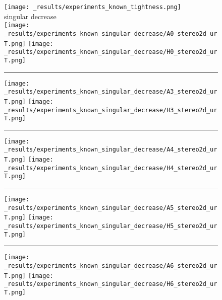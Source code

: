 \documentclass[11pt]{article}
\begin{document}
\newpage
\FloatBarrier
\begin{figure}[h]
  \centering
  \texttt{[image: \_results/experiments\_known\_tightness.png]} \\
  singular decrease \\
  \texttt{[image: \_results/experiments\_known\_singular\_decrease/A0\_stereo2d\_urT.png]}
  \texttt{[image: \_results/experiments\_known\_singular\_decrease/H0\_stereo2d\_urT.png]} 
  \\
  \hrule
  \texttt{[image: \_results/experiments\_known\_singular\_decrease/A3\_stereo2d\_urT.png]}
  \texttt{[image: \_results/experiments\_known\_singular\_decrease/H3\_stereo2d\_urT.png]} \\
  \hrule
  \texttt{[image: \_results/experiments\_known\_singular\_decrease/A4\_stereo2d\_urT.png]}
  \texttt{[image: \_results/experiments\_known\_singular\_decrease/H4\_stereo2d\_urT.png]} \\
  \hrule
  \texttt{[image: \_results/experiments\_known\_singular\_decrease/A5\_stereo2d\_urT.png]}
  \texttt{[image: \_results/experiments\_known\_singular\_decrease/H5\_stereo2d\_urT.png]} \\
  \hrule
  \texttt{[image: \_results/experiments\_known\_singular\_decrease/A6\_stereo2d\_urT.png]}
  \texttt{[image: \_results/experiments\_known\_singular\_decrease/H6\_stereo2d\_urT.png]} \\
  \label{fig:dual_decrease}
\end{figure}

  
\end{document}
